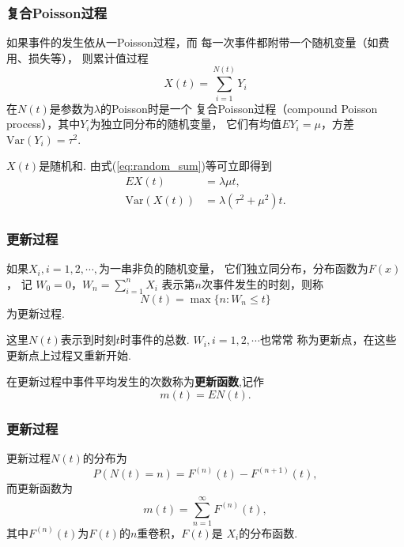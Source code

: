\begin{frame}
    \frametitle{复合Poisson过程}
    如果事件的发生依从一Poisson过程，而
    每一次事件都附带一个随机变量（如费用、损失等），
    则累计值过程
    \begin{equation*}
        X(t)=\sum_{i=1}^{N(t)}Y_i
    \end{equation*}
    在$N(t)$是参数为$\lambda$的Poisson时是一个
    复合Poisson过程（compound Poisson process），其中$Y_i$为独立同分布的随机变量，
    它们有均值$EY_i=\mu$，方差$\mathrm{Var}(Y_i)=\tau^2$.
    \begin{myproposition}[复合Poisson的数字特征]
        $X(t)$是随机和. 
        由式(\ref{eq:random_sum})等可立即得到
        \begin{align}
            EX(t)&=\lambda\mu t,\\
            \mathrm{Var}(X(t))&=\lambda(\tau^2+\mu^2)t.
        \end{align}
    \end{myproposition}
\end{frame}

\begin{frame}
    \frametitle{更新过程}
    \begin{mydefinition}[更新过程]
        如果$X_i,i=1,2,\cdots,$为一串非负的随机变量，
        它们独立同分布，分布函数为$F(x)$，
        记 $W_0=0$，$\displaystyle W_n=\sum_{i=1}^nX_i$
        表示第$n$次事件发生的时刻，则称
        \begin{equation}
            N(t)=\max\{n:W_n\leqslant t\}
        \end{equation}
        为更新过程. 
    \end{mydefinition}
    这里$N(t)$表示到时刻$t$时事件的总数. $W_i,i=1,2,\cdots$也常常
    称为更新点，在这些更新点上过程又重新开始. 
    
    在更新过程中事件平均发生的次数称为\textbf{更新函数},记作
    \begin{equation*}
        m(t)=EN(t). 
    \end{equation*}
\end{frame}

\begin{frame}
    \frametitle{更新过程}

    \begin{myproposition}[更新过程的分布与更新函数]
        更新过程$N(t)$的分布为
        \begin{equation*}
            P(N(t)=n)=F^{(n)}(t)-F^{(n+1)}(t),
        \end{equation*}
        而更新函数为
        \begin{equation*}
            m(t)=\sum_{n=1}^\infty F^{(n)}(t),
        \end{equation*}
        其中$F^{(n)}(t)$为$F(t)$的$n$重卷积，$F(t)$是
        $X_i$的分布函数. 
    \end{myproposition}
\end{frame}

